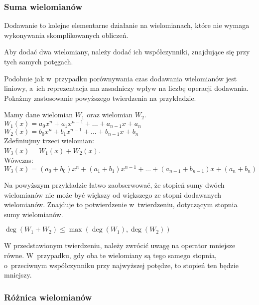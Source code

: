\subsubsection{Suma wielomianów}

Dodawanie to kolejne elementarne działanie na wielomianach, które nie wymaga wykonywania skomplikowanych obliczeń.

\begin{theorem}
	$ $\\
	Aby dodać dwa wielomiany, należy dodać ich współczynniki, znajdujące się przy tych samych potęgach.
\end{theorem}

Podobnie jak w~przypadku porównywania czas dodawania wielomianów jest liniowy, a~ich reprezentacja ma zasadniczy wpływ na liczbę operacji dodawania. Pokażmy zastosowanie powyższego twierdzenia na przykładzie.

\begin{example}
	$ $\\
	Mamy dane wielomian $W_1$ oraz wielomian $W_2$. \\
	$W_1(x) = a_0x^n + a_1x^{n-1} + ... + a_{n-1}x + a_n$ \\
	$W_2(x) = b_0x^n + b_1x^{n-1} + ... + b_{n-1}x + b_n$ \\
	Zdefiniujmy trzeci wielomian: \\
	$W_3(x) = W_1(x) + W_2(x)$. \\
	Wówczas: \\
	$W_3(x) = (a_0+b_0)x^n + (a_1+b_1)x^{n-1} + ... + (a_{n-1} + b_{n-1})x + (a_n + b_n)$
\end{example}

Na powyższym przykładzie łatwo zaobserwować, że stopień sumy dwóch wielomianów nie może być większy od większego ze stopni dodawanych wielomianów. Znajduje to potwierdzenie w~twierdzeniu, dotyczącym stopnia sumy wielomianów.

\begin{theorem}
	$ $\\
	$\deg(W_1 + W_2) \le \max(\deg(W_1),\deg (W_2))$
\end{theorem}

W przedstawionym twierdzeniu, należy zwrócić uwagę na operator mniejsze równe. W~przypadku, gdy oba te wielomiany są tego samego stopnia, o~przeciwnym współczynniku przy najwyższej potędze, to stopień ten będzie mniejszy.

\subsubsection{Różnica wielomianów}

